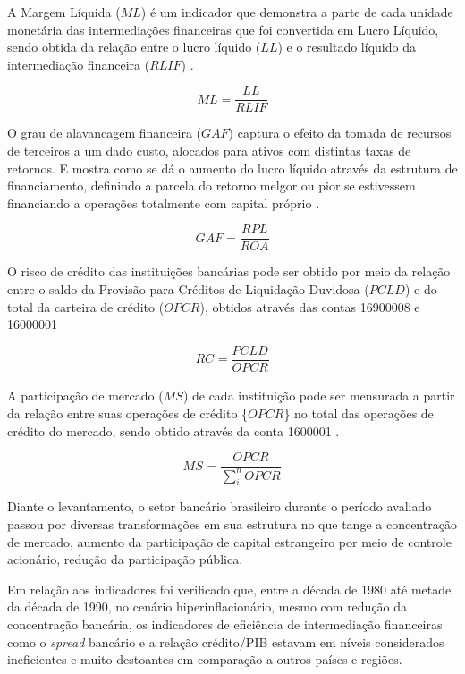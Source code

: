 \documentclass[
  12pt,
  12pt,
  openright,
  oneside,
  a4paper,
  chapter=TITLE,
  section=TITLE,
  subsection=TITLE,
  subsubsection=TITLE,
  english,
  portugues,
  sumario=tradicional]{abntex2}
\begin{document}
A Margem Líquida (\(ML\)) é um indicador que demonstra a parte de cada unidade monetária das intermediações financeiras que foi convertida em Lucro Líquido, sendo obtida da relação entre o lucro líquido (\(LL\)) e o resultado líquido da intermediação financeira (\(RLIF\)) \cite{assaf:2020}.

\begin{equation}
ML = \frac{LL}{RLIF}
\end{equation}

O grau de alavancagem financeira (\(GAF\)) captura o efeito da tomada de recursos de terceiros a um dado custo, alocados para ativos com distintas taxas de retornos. E mostra como se dá o aumento do lucro líquido através da estrutura de financiamento, definindo a parcela do retorno melgor ou pior se estivessem financiando a operações totalmente com capital próprio \cite{assaf:2020}.

\begin{equation}
GAF = \frac{RPL}{ROA}
\end{equation}

O risco de crédito das instituições bancárias pode ser obtido por meio da relação entre o saldo da Provisão para Créditos de Liquidação Duvidosa (\(PCLD\)) e do total da carteira de crédito (\(OPCR\)), obtidos através das contas 16900008 e 16000001 \cite{dantas:2012}

\begin{equation}
RC_{} = \frac{PCLD_{}}{OPCR_{}}
\end{equation}

A participação de mercado (\(MS\)) de cada instituição pode ser mensurada a partir da relação entre suas operações de crédito \{\(OPCR\)\} no total das operações de crédito do mercado, sendo obtido através da conta 1600001 \cite{dantas:2012}.

\begin{equation}
MS_{} = \frac{OPCR_{}}{\sum_{i}^{n}OPCR_{}} 
\end{equation}

Diante o levantamento, o setor bancário brasileiro durante o período avaliado passou por diversas transformações em sua estrutura no que tange a concentração de mercado, aumento da participação de capital estrangeiro por meio de controle acionário, redução da participação pública.

Em relação aos indicadores foi verificado que, entre a década de 1980 até metade da década de 1990, no cenário hiperinflacionário, mesmo com redução da concentração bancária, os indicadores de eficiência de intermediação financeiras como o \emph{spread} bancário e a relação crédito/PIB estavam em níveis considerados ineficientes e muito destoantes em comparação a outros países e regiões.
\end{document}
